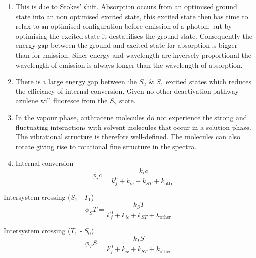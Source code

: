 \documentclass[
]{book}
\begin{document}
\begin{enumerate}
\def\labelenumi{\arabic{enumi}.}
\setcounter{enumi}{1}
\item
  This is due to Stokes' shift. Absorption occurs from an optimised ground state into an non optimised excited state, this excited state then has time to relax to an optimised configuration before emission of a photon, but by optimising the excited state it destabilises the ground state. Consequently the energy gap between the ground and excited state for absorption is bigger than for emission. Since energy and wavelength are inversely proportional the wavelength of emission is always longer than the wavelength of absorption.
\item
  There is a large energy gap between the \(S_2\) \& \(S_1\) excited states which reduces the efficiency of internal conversion. Given no other deactivation pathway azulene will fluoresce from the \(S_2\) state.
\item
  In the vapour phase, anthracene molecules do not experience the strong and fluctuating interactions with solvent molecules that occur in a solution phase. The vibrational structure is therefore well-defined. The molecules can also rotate giving rise to rotational fine structure in the spectra.
\item
  Internal conversion
  \begin{equation}
  \phi_ic = \frac{k_ic}{k_f^0+k_{ic}+ k_{ST}+k_{\textrm{other}}}
  \label{eq:QYIC}
  \end{equation}
\end{enumerate}

Intersystem crossing (\(S_1\) - \(T_1\))\\
\begin{equation}
\phi_ST = \frac{k_ST}{k_f^0+k_{ic}+ k_{ST}+k_{\textrm{other}}}
\label{eq:QYST}
\end{equation}

Intersystem crossing (\(T_1\) - \(S_0\))\\
\begin{equation}
\phi_TS = \frac{k_TS}{k_f^0+k_{ic}+ k_{ST}+k_{\textrm{other}}}
\label{eq:QYTS}
\end{equation}
\end{document}
